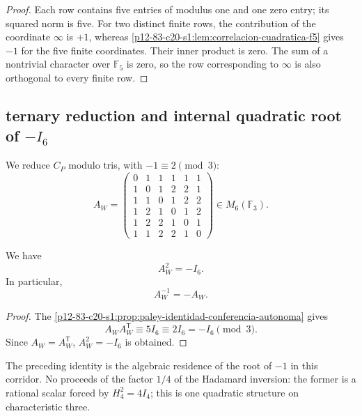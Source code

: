 \begin{proof}
Each row contains five entries of modulus one and one zero entry; its
squared norm is five. For two distinct finite rows, the contribution
of the coordinate \(\infty\) is \(+1\), whereas
\cref{p12-83-c20-s1:lem:correlacion-cuadratica-f5} gives \(-1\) for the five finite
coordinates. Their inner product is zero. The sum of a nontrivial character
over \(\mathbb F_5\) is zero, so the row corresponding to
\(\infty\) is also orthogonal to every finite row.
\end{proof}

\subsection{ternary reduction and internal quadratic root of \texorpdfstring{\(-I_6\)}{-I₆}}

We reduce \(C_P\) modulo tris, with \(-1\equiv2\pmod3\):
\begin{equation}
 A_W=
 \begin{pmatrix}
 0&1&1&1&1&1\\
 1&0&1&2&2&1\\
 1&1&0&1&2&2\\
 1&2&1&0&1&2\\
 1&2&2&1&0&1\\
 1&1&2&2&1&0
 \end{pmatrix}
 \in M_6(\mathbb F_3).
 \label{p12-83-c20-s1:eq:matriz-paley-witt-ternaria}
\end{equation}

\begin{theorem}
\label{p12-83-c20-s1:thm:aw-cuadrado-menos-identidad-autonomo}
We have
\begin{equation}
 \boxed{A_W^2=-I_6.}
 \label{p12-83-c20-s1:eq:aw-cuadrado-menos-identidad-autonomo}
\end{equation}
In particular,
\[
 A_W^{-1}=-A_W.
\]
\end{theorem}

\begin{proof}
The \cref{p12-83-c20-s1:prop:paley-identidad-conferencia-autonoma} gives
\[
 A_WA_W^{\mathsf T}
 \equiv5I_6
 \equiv2I_6
 =-I_6
 \pmod3.
\]
Since \(A_W=A_W^{\mathsf T}\), \(A_W^2=-I_6\) is obtained.
\end{proof}

The preceding identity is the algebraic residence of the root of \(-1\)
in this corridor. No proceeds of the factor \(1/4\) of the Hadamard inversion:
the former is a rational scalar forced by \(H_4^2=4I_4\); this is one
quadratic structure on characteristic three.

